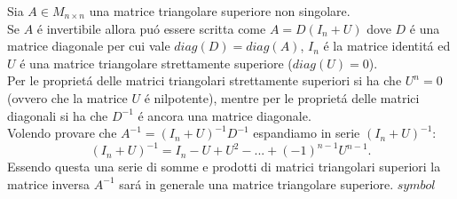 Sia $A \in M_{n \times n}$ una matrice triangolare superiore non singolare.\\
Se $A$ \'e invertibile allora pu\'o essere scritta come $A=D(\mathit{I_n}+U)$ dove $D$ \'e una matrice diagonale per cui vale $diag(D)=diag(A)$, $\mathit{I_n}$ \'e la matrice identit\'a ed $U$ \'e una matrice triangolare strettamente superiore ($diag(U)=0$).\\
Per le propriet\'a delle matrici triangolari strettamente superiori si ha che $U^n = 0$ (ovvero che la matrice $U$ \'e nilpotente), mentre per le propriet\'a delle matrici diagonali si ha che $D^{-1}$ \'e ancora una matrice diagonale.
\\
Volendo provare che $A^{-1}=(\mathit{I_n}+U)^{-1}D^{-1}$ espandiamo in serie $ (\mathit{I_n}+U)^{-1}$:
\[
(\mathit{I_n}+U)^{-1}=\mathit{I_n}-U+U^2-...+(-1)^{n-1}U^{n-1}.
\]
Essendo questa una serie di somme e prodotti di matrici triangolari superiori la matrice inversa $A^{-1}$ sar\'a in generale una matrice triangolare superiore.
$symbol$
